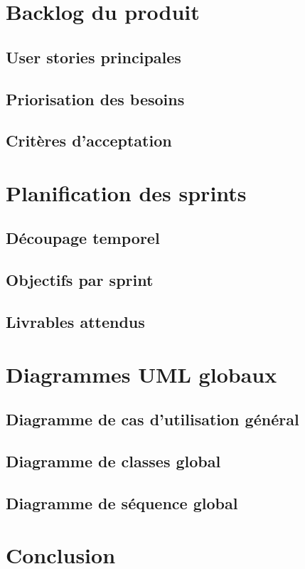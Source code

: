 \documentclass[12pt,a4paper]{report}
\begin{document}
\section{Backlog du produit}
\subsection{User stories principales}
\subsection{Priorisation des besoins}
\subsection{Critères d'acceptation}

\section{Planification des sprints}
\subsection{Découpage temporel}
\subsection{Objectifs par sprint}
\subsection{Livrables attendus}

\section{Diagrammes UML globaux}
\subsection{Diagramme de cas d'utilisation général}
\subsection{Diagramme de classes global}
\subsection{Diagramme de séquence global}

\section{Conclusion}
\end{document}

